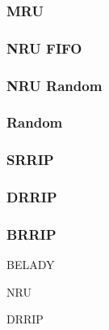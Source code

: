 \subsubsection{MRU}
\subsubsection{NRU FIFO}
\subsubsection{NRU Random}
\subsubsection{Random}
\subsubsection{SRRIP}
\subsubsection{DRRIP}
\subsubsection{BRRIP}


BELADY

NRU

DRRIP
